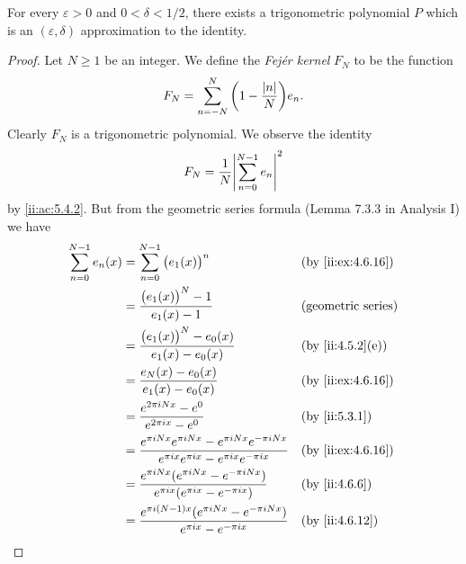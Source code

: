 \begin{lem}\label{ii:5.4.6}
  For every \(\varepsilon > 0\) and \(0 < \delta < 1 / 2\), there exists a trigonometric polynomial \(P\) which is an \((\varepsilon, \delta)\) approximation to the identity.
\end{lem}

\begin{proof}
  Let \(N \geq 1\) be an integer.
  We define the \emph{Fejér kernel} \(F_N\) to be the function
  \[
    F_N = \sum_{n = -N}^N \bigg(1 - \dfrac{\left\lvert n\right\rvert}{N}\bigg) e_n.
  \]
  Clearly \(F_N\) is a trigonometric polynomial.
  We observe the identity
  \[
    F_N = \dfrac{1}{N} \abs{\sum_{n = 0}^{N - 1} e_n}^2
  \]
  by \cref{ii:ac:5.4.2}.
  But from the geometric series formula (Lemma 7.3.3 in Analysis I) we have
  \begin{align*}
    \sum_{n = 0}^{N - 1} e_n(x) & = \sum_{n = 0}^{N - 1} \big(e_1(x)\big)^n                                                                                &  & \by{ii:ex:4.6.16}         \\
                                & = \dfrac{\big(e_1(x)\big)^N - 1}{e_1(x) - 1}                                                                             &  & \text{(geometric series)} \\
                                & = \dfrac{\big(e_1(x)\big)^N - e_0(x)}{e_1(x) - e_0(x)}                                                                   &  & \by{ii:4.5.2}[e]          \\
                                & = \dfrac{e_N(x) - e_0(x)}{e_1(x) - e_0(x)}                                                                               &  & \by{ii:ex:4.6.16}         \\
                                & = \dfrac{e^{2 \pi i N x} - e^0}{e^{2 \pi i x} - e^0}                                                                     &  & \by{ii:5.3.1}             \\
                                & = \dfrac{e^{\pi i N x} e^{\pi i N x} - e^{\pi i N x} e^{-\pi i N x}}{e^{\pi i x} e^{\pi i x} - e^{\pi i x} e^{-\pi i x}} &  & \by{ii:ex:4.6.16}         \\
                                & = \dfrac{e^{\pi i N x} (e^{\pi i N x} - e^{-\pi i N x})}{e^{\pi i x} (e^{\pi i x} - e^{-\pi i x})}                       &  & \by{ii:4.6.6}             \\
                                & = \dfrac{e^{\pi i (N - 1) x} (e^{\pi i N x} - e^{-\pi i N x})}{e^{\pi i x} - e^{-\pi i x}}                               &  & \by{ii:4.6.12}            \\

\end{align*}
\end{proof}
